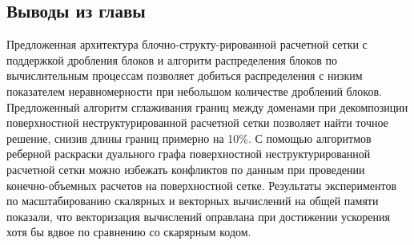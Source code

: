 
\subsection{Выводы из главы}

Предложенная архитектура блочно-структу-рированной расчетной сетки с поддержкой дробления блоков и алгоритм распределения блоков по вычислительным процессам позволяет добиться распределения с низким показателем неравномерности при небольшом количестве дроблений блоков.
Предложенный алгоритм сглаживания границ между доменами при декомпозиции поверхностной неструктурированной расчетной сетки позволяет найти точное решение, снизив длины границ примерно на 10\%.
С помощью алгоритмов реберной раскраски дуального графа поверхностной неструктурированной расчетной сетки можно избежать конфликтов по данным при проведении конечно-объемных расчетов на поверхностной сетке.
Результаты экспериментов по масштабированию скалярных и векторных вычислений на общей памяти показали, что векторизация вычислений оправлана при достижении ускорения хотя бы вдвое по сравнению со скарярным кодом.

